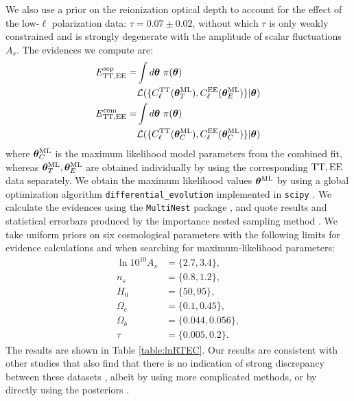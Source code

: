 \documentclass[amsmath, prd, reprint, aps]{revtex4-1}
\newcommand{\tv}{\bm{\theta}}
\newcommand{\tML}{\tv^{\rm ML}}
\begin{document}
We also use a prior on the reionization optical depth to account for the effect of the low-$\ell$ polarization data: $\tau = 0.07\pm0.02$, without which $\tau$ is only weakly constrained and is strongly degenerate with the amplitude of scalar fluctuations $A_s$. The evidences we compute are:
\begin{align}
    E^{\rm sep}_{\rm TT, EE} =& \int d\tv ~ \pi(\tv) \nonumber \\ & \mathcal{L}(\{C_\ell^{\rm TT}(\tML_T), C_\ell^{\rm EE}(\tML_E)\}|\tv)  \\
    {E}^{\rm com}_{\rm TT, EE} =& \int d\tv ~ \pi(\tv) \nonumber \\  & \mathcal{L}(\{C_\ell^{\rm TT}(\tML_C), C_\ell^{\rm EE}(\tML_C)\}|\tv)
\end{align}
where $\tML_C$ is the maximum likelihood model parameters from the combined fit, whereas $\tML_T, \tML_E$ are obtained individually by using the corresponding ${\rm TT, EE}$ data separately. We obtain the maximum likelihood values $\tML$ by using a global optimization algorithm {\tt differential\_evolution} \cite{Storn1997} implemented in {\tt scipy} \cite{scipy}. We calculate the evidences using the \texttt{MultiNest} package \cite{Feroz:2007kg, Feroz:2008xx}, and quote results and statistical errorbars produced by the importance nested sampling method \cite{Feroz:2013hea}. We take uniform priors on six cosmological parameters with the following limits for evidence calculations and when searching for maximum-likelihood parameters: \begin{align}\ln 10^{10} A_s &= \{2.7, 3.4\}, \nonumber \\ n_s &= \{0.8, 1.2\}, \nonumber \\ H_0 &=\{50, 95\}, \nonumber \\ \Omega_c &=\{0.1, 0.45\}, \nonumber \\ \Omega_b &= \{0.044, 0.056\}, \nonumber \\ \tau &=\{0.005, 0.2\}. \nonumber \end{align} 
The results are shown in Table \ref{table:lnRTEC}.  Our results are consistent with other studies that also find that there is no indication of strong discrepancy between these datasets \cite{Shafieloo:2016zga}, albeit by using more complicated methods, or by directly using the posteriors \cite{Lin:2017bhs}.
\end{document}
